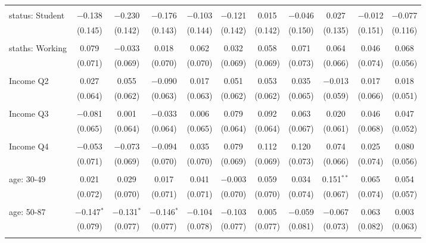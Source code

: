\begin{tabular}{@{\extracolsep{5pt}}lcccccccccc}
  & & & & & & & & & & \\ 
 status: Student & $-$0.138 & $-$0.230 & $-$0.176 & $-$0.103 & $-$0.121 & 0.015 & $-$0.046 & 0.027 & $-$0.012 & $-$0.077 \\ 
  & (0.145) & (0.142) & (0.143) & (0.144) & (0.142) & (0.142) & (0.150) & (0.135) & (0.151) & (0.116) \\ 
  & & & & & & & & & & \\ 
 staths: Working & 0.079 & $-$0.033 & 0.018 & 0.062 & 0.032 & 0.058 & 0.071 & 0.064 & 0.046 & 0.068 \\ 
  & (0.071) & (0.069) & (0.070) & (0.070) & (0.069) & (0.069) & (0.073) & (0.066) & (0.074) & (0.056) \\ 
  & & & & & & & & & & \\ 
 Income Q2 & 0.027 & 0.055 & $-$0.090 & 0.017 & 0.051 & 0.053 & 0.035 & $-$0.013 & 0.017 & 0.018 \\ 
  & (0.064) & (0.062) & (0.063) & (0.063) & (0.062) & (0.062) & (0.065) & (0.059) & (0.066) & (0.051) \\ 
  & & & & & & & & & & \\ 
 Income Q3 & $-$0.081 & 0.001 & $-$0.033 & 0.006 & 0.079 & 0.092 & 0.063 & 0.020 & 0.046 & 0.047 \\ 
  & (0.065) & (0.064) & (0.064) & (0.065) & (0.064) & (0.064) & (0.067) & (0.061) & (0.068) & (0.052) \\ 
  & & & & & & & & & & \\ 
 Income Q4 & $-$0.053 & $-$0.073 & $-$0.094 & 0.035 & 0.079 & 0.112 & 0.120 & 0.074 & 0.025 & 0.080 \\ 
  & (0.071) & (0.069) & (0.070) & (0.070) & (0.069) & (0.069) & (0.073) & (0.066) & (0.074) & (0.056) \\ 
  & & & & & & & & & & \\ 
 age: 30-49 & 0.021 & 0.029 & 0.017 & 0.041 & $-$0.003 & 0.059 & 0.034 & 0.151$^{**}$ & 0.065 & 0.054 \\ 
  & (0.072) & (0.070) & (0.071) & (0.071) & (0.070) & (0.070) & (0.074) & (0.067) & (0.074) & (0.057) \\ 
  & & & & & & & & & & \\ 
 age: 50-87 & $-$0.147$^{*}$ & $-$0.131$^{*}$ & $-$0.146$^{*}$ & $-$0.104 & $-$0.103 & 0.005 & $-$0.059 & $-$0.067 & 0.063 & 0.003 \\ 
  & (0.079) & (0.077) & (0.077) & (0.078) & (0.077) & (0.077) & (0.081) & (0.073) & (0.082) & (0.063) \\ 
  & & & & & & & & & & \\ 

\end{tabular}
